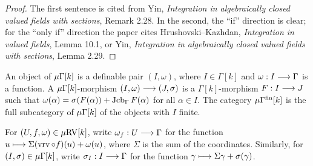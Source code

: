 \begin{proof}
\leanok
The first sentence is cited from Yin, \emph{Integration in algebraically closed valued fields with sections}, Remark 2.28. In the second, the ``if'' direction is clear; for the ``only if'' direction the paper cites Hrushovski--Kazhdan, \emph{Integration in valued fields}, Lemma 10.1, or Yin, \emph{Integration in algebraically closed valued fields with sections}, Lemma 2.29.
\end{proof}

\setcounter{theorem}{15}
\begin{definition}
\label{def-Ga-cat-mu}
\leanok
{}
An object of $\mu\Gamma[k]$ is a definable pair $(I, \omega)$, where $I \in \Gamma[k]$ and $\omega : I \longrightarrow \Gamma$ is a function. A $\mu\Gamma[k]$-morphism $(I, \omega) \longrightarrow (J, \sigma)$ is a $\Gamma[k]$-morphism $F : I \longrightarrow J$ such that $\omega(\alpha) = \sigma(F(\alpha)) + \operatorname{Jcb}_{\Gamma} F(\alpha)$ for all $\alpha \in I$. The category $\mu\Gamma^{\mathrm{fin}}[k]$ is the full subcategory of $\mu\Gamma[k]$ of the objects with $I$ finite.
\end{definition}

\setcounter{theorem}{16}
\begin{definition}
\label{comp-form}
\leanok
{}
For $(U, f, \omega) \in \mu\mathrm{RV}[k]$, write $\omega_f : U \longrightarrow \Gamma$ for the function $u \longmapsto \Sigma(\operatorname{vrv} \circ f)(u) + \omega(u)$, where $\Sigma$ is the sum of the coordinates. Similarly, for $(I, \sigma) \in \mu\Gamma[k]$, write $\sigma_I : I \longrightarrow \Gamma$ for the function $\gamma \longmapsto \Sigma \gamma + \sigma(\gamma)$.
\end{definition}

